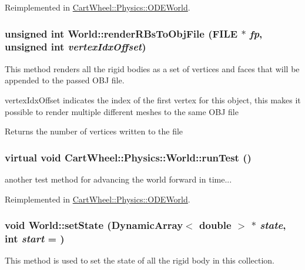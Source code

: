 Reimplemented in \hyperlink{classCartWheel_1_1Physics_1_1ODEWorld_a49a6eb9fccf6d96fb57ea626431ce7a4}{CartWheel::Physics::ODEWorld}.

\hypertarget{classCartWheel_1_1Physics_1_1World_a78f3fa0d8ff370a6ca8a5e15d7a14bf4}{
\subsubsection[{renderRBsToObjFile}]{\setlength{\rightskip}{0pt plus 5cm}unsigned int World::renderRBsToObjFile (FILE $\ast$ {\em fp}, \/  unsigned int {\em vertexIdxOffset})}}
\label{classCartWheel_1_1Physics_1_1World_a78f3fa0d8ff370a6ca8a5e15d7a14bf4}
This method renders all the rigid bodies as a set of vertices and faces that will be appended to the passed OBJ file.

vertexIdxOffset indicates the index of the first vertex for this object, this makes it possible to render multiple different meshes to the same OBJ file

Returns the number of vertices written to the file \hypertarget{classCartWheel_1_1Physics_1_1World_a2181315ea3069768c0c10f9a9d632f89}{
\subsubsection[{runTest}]{\setlength{\rightskip}{0pt plus 5cm}virtual void CartWheel::Physics::World::runTest ()}}
\label{classCartWheel_1_1Physics_1_1World_a2181315ea3069768c0c10f9a9d632f89}
another test method for advancing the world forward in time... 

Reimplemented in \hyperlink{classCartWheel_1_1Physics_1_1ODEWorld_a24befdbc6e6997f125d65b649c5b8fde}{CartWheel::Physics::ODEWorld}.

\hypertarget{classCartWheel_1_1Physics_1_1World_a8dd0eefe9170b86b0bca968851db88f5}{
\subsubsection[{setState}]{\setlength{\rightskip}{0pt plus 5cm}void World::setState (DynamicArray$<$ double $>$ $\ast$ {\em state}, \/  int {\em start} = {})}}
\label{classCartWheel_1_1Physics_1_1World_a8dd0eefe9170b86b0bca968851db88f5}
This method is used to set the state of all the rigid body in this collection. 

